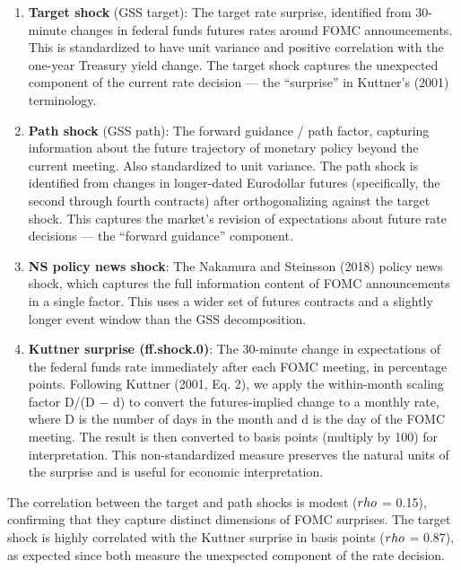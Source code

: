 \documentclass[12pt]{article}
\begin{document}
\begin{enumerate}
\def\labelenumi{\arabic{enumi}.}
\item
  \textbf{Target shock} (GSS target): The target rate surprise,
  identified from 30-minute changes in federal funds futures rates
  around FOMC announcements. This is standardized to have unit variance
  and positive correlation with the one-year Treasury yield change. The
  target shock captures the unexpected component of the current rate
  decision --- the ``surprise'' in Kuttner's (2001) terminology.
\item
  \textbf{Path shock} (GSS path): The forward guidance / path factor,
  capturing information about the future trajectory of monetary policy
  beyond the current meeting. Also standardized to unit variance. The
  path shock is identified from changes in longer-dated Eurodollar
  futures (specifically, the second through fourth contracts) after
  orthogonalizing against the target shock. This captures the market's
  revision of expectations about future rate decisions --- the ``forward
  guidance'' component.
\item
  \textbf{NS policy news shock}: The Nakamura and Steinsson (2018)
  policy news shock, which captures the full information content of FOMC
  announcements in a single factor. This uses a wider set of futures
  contracts and a slightly longer event window than the GSS
  decomposition.
\item
  \textbf{Kuttner surprise (ff.shock.0)}: The 30-minute change in
  expectations of the federal funds rate immediately after each FOMC
  meeting, in percentage points. Following Kuttner (2001, Eq. 2), we
  apply the within-month scaling factor D/(D \(-\) d) to convert the
  futures-implied change to a monthly rate, where D is the number of
  days in the month and d is the day of the FOMC meeting. The result is
  then converted to basis points (multiply by 100) for interpretation.
  This non-standardized measure preserves the natural units of the
  surprise and is useful for economic interpretation.
\end{enumerate}

The correlation between the target and path shocks is modest (\(\\rho\)
= 0.15), confirming that they capture distinct dimensions of FOMC
surprises. The target shock is highly correlated with the Kuttner
surprise in basis points (\(\\rho\) = 0.87), as expected since both
measure the unexpected component of the rate decision.
\end{document}
